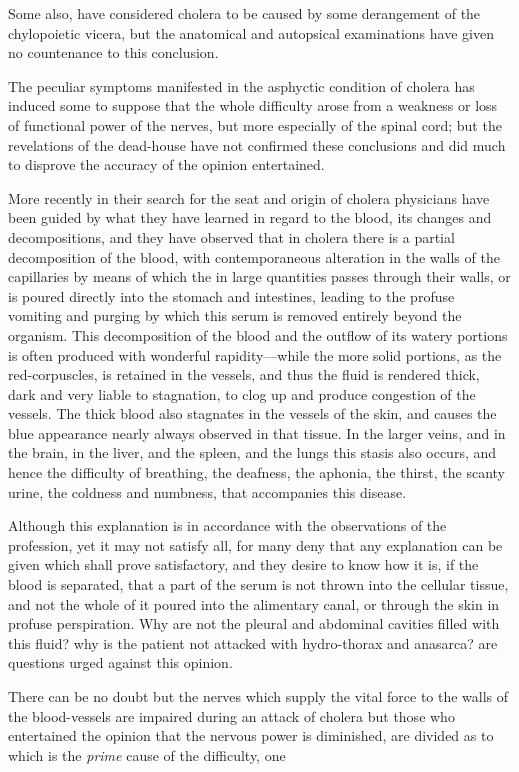 
Some also, have considered cholera to be caused by some derangement
of the chylopoietic vicera, but the anatomical and autopsical examinations
have given no countenance to this conclusion.

The peculiar symptoms manifested in the asphyctic condition of
cholera has induced some to suppose that the whole difficulty arose
from a weakness or loss of functional power of the nerves, but more
especially of the spinal cord; but the revelations of the dead-house
have not confirmed these conclusions and did much to disprove the
accuracy of the opinion entertained.

More recently in their search for the seat and origin of cholera
physicians have been guided by what they have learned in regard to
the blood, its changes and decompositions, and they have observed that
in cholera there is a partial decomposition of the blood, with contemporaneous 
alteration in the walls of the capillaries by means of which
the  in large quantities passes through their walls, or
is poured directly into the stomach and intestines, leading to the profuse
vomiting and purging by which this serum is removed entirely beyond
the organism. This decomposition of the blood and the outflow of
its watery portions is often produced with wonderful rapidity---while
the more solid portions, as the red-corpuscles, is retained in the vessels,
and thus the fluid is rendered thick, dark and very liable to stagnation,
to clog up and produce congestion of the vessels. The thick blood
also stagnates in the vessels of the skin, and causes the blue appearance
nearly always observed in that tissue. In the larger veins, and in the
brain, in the liver, and the spleen, and the lungs this stasis also occurs,
and hence the difficulty of breathing, the deafness, the aphonia, the
thirst, the scanty urine, the coldness and numbness, that accompanies
this disease.

Although this explanation is in accordance with the observations of
the profession, yet it may not satisfy all, for many deny that any explanation
can be given which shall prove satisfactory, and they desire
to know how it is, if the blood is  separated, that a part of the
serum is not thrown into the cellular tissue, and not the whole of it
poured into the alimentary canal, or through the skin in profuse perspiration.
Why are not the pleural and abdominal cavities filled with this
fluid? why is the patient not attacked with hydro-thorax and anasarca?
are questions urged against this opinion.

There can be no doubt but the nerves which supply the vital force to
the walls of the blood-vessels are impaired during an attack of cholera
but those who entertained the opinion that the nervous power is diminished,
are divided as to which is the \emph{prime} cause of the difficulty, one\endinput